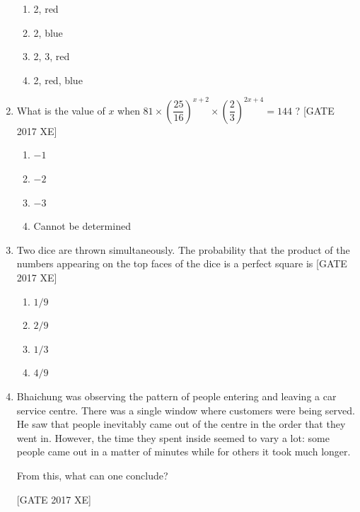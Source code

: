 \documentclass[journal,12pt,onecolumn]{IEEEtran}
\theoremstyle{remark}
\begin{document}
\begin{enumerate}
\begin{multicols}{2}
\begin{enumerate}
    \item 2, red
    \item 2, blue
    \item 2, 3, red
    \item 2, red, blue
\end{enumerate}
\end{multicols}

\item What is the value of $x$ when $81 \times \left(\dfrac{25}{16}\right)^{x+2} \times \left(\dfrac{2}{3}\right)^{2x+4} = 144$ ?  
\hfill [GATE 2017 XE]

\begin{multicols}{2}
\begin{enumerate}
    \item $-1$
    \item $-2$
    \item $-3$
    \item Cannot be determined
\end{enumerate}
\end{multicols}

\item Two dice are thrown simultaneously.  
The probability that the product of the numbers appearing on the top faces of the dice is a perfect square is \hfill [GATE 2017 XE]

\begin{multicols}{2}
\begin{enumerate}
    \item $1/9$
    \item $2/9$
    \item $1/3$
    \item $4/9$
\end{enumerate}
\end{multicols}
\item Bhaichung was observing the pattern of people entering and leaving a car service centre. There was a single window where customers were being served. He saw that people inevitably came out of the centre in the order that they went in. However, the time they spent inside seemed to vary a lot: some people came out in a matter of minutes while for others it took much longer.

From this, what can one conclude?

 \hfill [GATE 2017 XE]
 

\end{enumerate}
\end{document}

